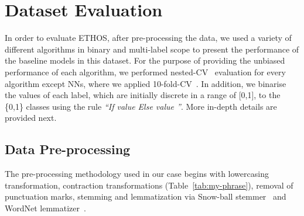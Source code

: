 \documentclass[sigconf]{acmart}
\begin{document}
\section{Dataset Evaluation}
In order to evaluate ETHOS, after pre-processing the data, we used a variety of different algorithms in binary and multi-label scope to present the performance of the baseline models in this dataset. For the purpose of providing the unbiased performance of each algorithm, we performed nested-CV~\cite{nestedCrossValidation} evaluation for every algorithm except NNs, where we applied 10-fold-CV~\cite{crossValidation}. In addition, we binarise the values of each label, which are initially discrete in a range of [0,1], to the \{0,1\} classes using the rule \textit{``If value  Else value ''}.  More in-depth details are provided next.

\subsection{Data Pre-processing}
The pre-processing methodology used in our case begins with lowercasing transformation, contraction transformations (Table~\ref{tab:my-phrase}), removal of punctuation marks, stemming and lemmatization via Snow-ball stemmer~\cite{snowball} and WordNet lemmatizer~\cite{wordnet}. 

\renewcommand{\thetable}{2}
\begin{table}[ht]
\centering
{}
\caption{Phrases and words transformations}
\label{tab:my-phrase}
\end{table}
\end{document}
